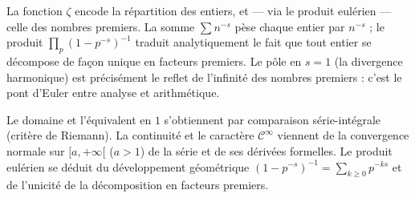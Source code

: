 \begin{significationintuitive}
La fonction $\zeta$ encode la répartition des entiers, et — via le produit
eulérien — celle des nombres premiers. La somme $\sum n^{-s}$ pèse chaque
entier par $n^{-s}$ ; le produit $\prod_p (1-p^{-s})^{-1}$ traduit
analytiquement le fait que tout entier se décompose de façon unique en facteurs
premiers. Le pôle en $s=1$ (la divergence harmonique) est précisément le reflet
de l'infinité des nombres premiers : c'est le pont d'Euler entre analyse et
arithmétique.
\end{significationintuitive}

\decsep{}


\begin{ideepreuve}
Le domaine et l'équivalent en $1$ s'obtiennent par comparaison série-intégrale
(critère de Riemann). La continuité et le caractère $\mathcal{C}^{\infty}$
viennent de la convergence normale sur $[a,+\infty[$ ($a>1$) de la série et de
ses dérivées formelles. Le produit eulérien se déduit du développement
géométrique $(1-p^{-s})^{-1}=\sum_{k\geq 0}p^{-ks}$ et de l'unicité de la
décomposition en facteurs premiers.
\end{ideepreuve}

\vspace{10pt}

